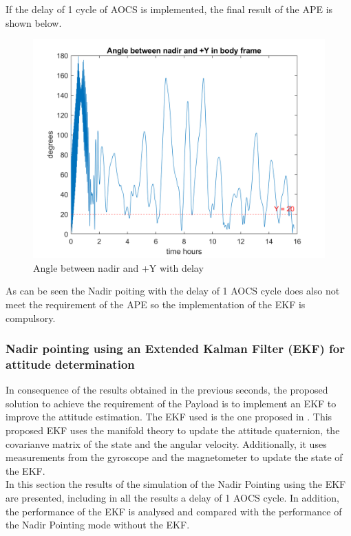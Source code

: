 If the delay of 1 cycle of AOCS is implemented, the final result of the APE is shown below.

\begin{figure}[H]
    \centering
    \includegraphics[width=0.7\linewidth]{res/img/Nadir_no_EKF/APE delay.png}
    \caption{Angle between nadir and +Y with delay}
    \label{fig:AngleNadirYdelay}
\end{figure}

\noindent As can be seen the Nadir poiting with the delay of 1 AOCS cycle does also not meet the requirement of the APE so the implementation of the EKF is compulsory.

\subsubsection{Nadir pointing using an Extended Kalman Filter (EKF) for attitude determination}
In consequence of the results obtained in the previous seconds, the proposed solution to achieve
the requirement of the Payload is to implement an EKF to improve the attitude estimation. 
The EKF used is the one proposed in \cite{EKF}. This proposed EKF uses the manifold theory to update
the attitude quaternion, the covarianve matrix of the state and the angular velocity. Additionally, it uses measurements
from the gyroscope and the magnetometer to update the state of the EKF.\\

\noindent In this section the results of the simulation of the Nadir Pointing using the EKF are presented, including in all the results a delay of 1 AOCS cycle.
In addition, the performance of the EKF is analysed and compared with the performance of the Nadir Pointing mode without the EKF.

